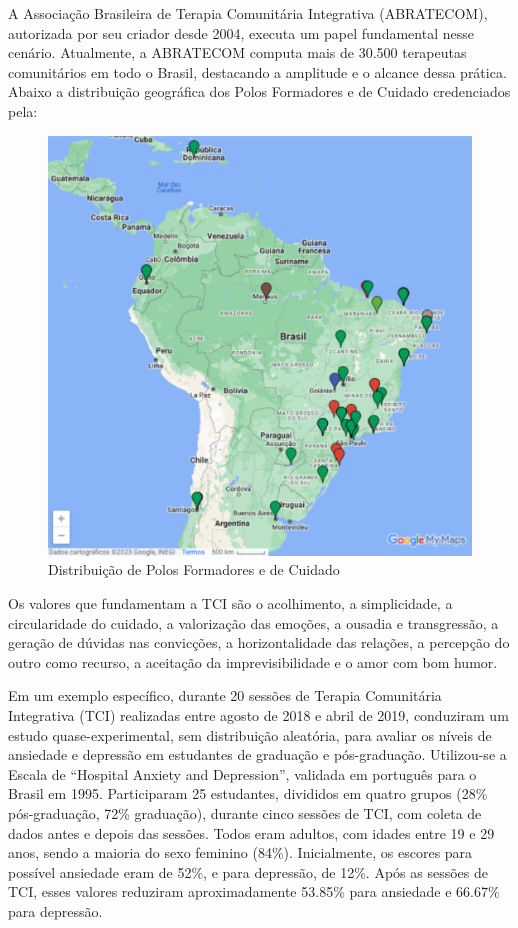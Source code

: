 A Associação Brasileira de Terapia Comunitária Integrativa (ABRATECOM), autorizada por seu criador desde 2004, executa um papel fundamental nesse cenário. Atualmente, a ABRATECOM computa mais de 30.500 terapeutas comunitários em todo o Brasil, destacando a amplitude e o alcance dessa prática.\cite{SILVAFRANCO} Abaixo a distribuição geográfica dos Polos Formadores e de Cuidado credenciados pela\cite{ABRATECOM}:

\begin{figure}[!h] %
    \centering
    \includegraphics[scale=0.7]{latex/figuras/polos.pdf}
    \caption[Terapia Comunitária Integrativa]%
    {Distribuição de Polos Formadores e de Cuidado}%
\end{figure}

Os valores que fundamentam a TCI são o acolhimento, a simplicidade, a circularidade do cuidado, a valorização das emoções, a ousadia e transgressão, a geração de dúvidas nas convicções, a horizontalidade das relações, a percepção do outro como recurso, a aceitação da imprevisibilidade e o amor com bom humor.\cite{SILVA}

Em um exemplo específico, durante 20 sessões de Terapia Comunitária Integrativa (TCI) realizadas entre agosto de 2018 e abril de 2019, \cite{BOARETTO} conduziram um estudo quase-experimental, sem distribuição aleatória, para avaliar os níveis de ansiedade e depressão em estudantes de graduação e pós-graduação. Utilizou-se a Escala de “Hospital Anxiety and Depression”, validada em português para o Brasil em 1995. Participaram 25 estudantes, divididos em quatro grupos (28\% pós-graduação, 72\% graduação), durante cinco sessões de TCI, com coleta de dados antes e depois das sessões. Todos eram adultos, com idades entre 19 e 29 anos, sendo a maioria do sexo feminino (84\%). Inicialmente, os escores para possível ansiedade eram de 52\%, e para depressão, de 12\%. Após as sessões de TCI, esses valores reduziram aproximadamente 53.85\% para ansiedade e 66.67\% para depressão.

